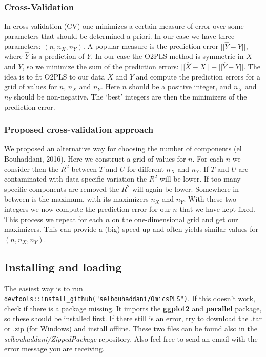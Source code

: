 \documentclass[]{article}
\begin{document}
\subsubsection{Cross-Validation}\label{cross-validation}

In cross-validation (CV) one minimizes a certain measure of error over
some parameters that should be determined a priori. In our case we have
three parameters: \((n, n_X, n_Y)\). A popular measure is the prediction
error \(||\hat{Y} - Y||\), where \(\hat{Y}\) is a prediction of \(Y\).
In our case the O2PLS method is symmetric in \(X\) and \(Y\), so we
minimize the sum of the prediction errors:
\(||\hat{X} - X||+||\hat{Y} - Y||\). The idea is to fit O2PLS to our
data \(X\) and \(Y\) and compute the prediction errors for a grid of
values for \(n\), \(n_X\) and \(n_Y\). Here \(n\) should be a positive
integer, and \(n_X\) and \(n_Y\) should be non-negative. The `best'
integers are then the minimizers of the prediction error.

\subsubsection{Proposed cross-validation
approach}\label{proposed-cross-validation-approach}

We proposed an alternative way for choosing the number of components (el
Bouhaddani, 2016). Here we construct a grid of values for \(n\). For
each \(n\) we consider then the \(R^2\) between \(T\) and \(U\) for
different \(n_X\) and \(n_Y\). If \(T\) and \(U\) are contaminated with
data-specific variation the \(R^2\) will be lower. If too many specific
components are removed the \(R^2\) will again be lower. Somewhere in
between is the maximum, with its maximizers \(n_X\) and \(n_Y\). With
these two integers we now compute the prediction error for our \(n\)
that we have kept fixed. This process we repeat for each \(n\) on the
one-dimensional grid and get our maximizers. This can provide a (big)
speed-up and often yields similar values for \((n, n_X, n_Y)\).

\subsection{Installing and loading}\label{installing-and-loading}

The easiest way is to run
\texttt{devtools::install\_github("selbouhaddani/OmicsPLS")}. If this
doesn't work, check if there is a package missing. It imports the
\textbf{ggplot2} and \textbf{parallel} package, so these should be
installed first. If there still is an error, try to download the .tar or
.zip (for Windows) and install offline. These two files can be found
also in the \emph{selbouhaddani/ZippedPackage} repository. Also feel
free to send an email with the error message you are receiving.
\end{document}
